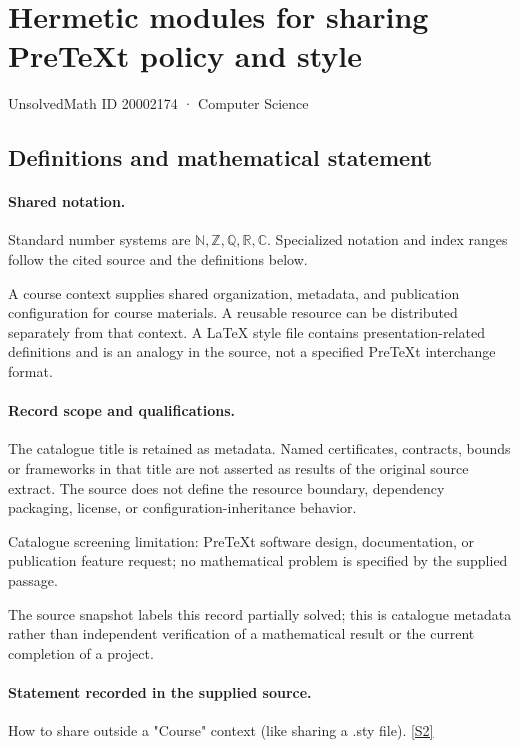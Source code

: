\documentclass[11pt]{article}
\newcommand{\sref}[2]{\hyperlink{source:#1:#2}{[S#2]}}
\begin{document}
\setcounter{section}{20002173}
\section{Hermetic modules for sharing PreTeXt policy and style}\label{20002174}
{\small\sffamily UnsolvedMath ID 20002174 · Computer Science}
\subsection{Definitions and mathematical statement}

\paragraph{Shared notation.}Standard number systems are $\mathbb N,\mathbb Z,\mathbb Q,\mathbb R,\mathbb C$. Specialized notation and index ranges follow the cited source and the definitions below.


A course context supplies shared organization, metadata, and publication configuration for course materials. A reusable resource can be distributed separately from that context. A LaTeX style file contains presentation-related definitions and is an analogy in the source, not a specified PreTeXt interchange format.
\paragraph{Record scope and qualifications.}
The catalogue title is retained as metadata. Named certificates, contracts, bounds or frameworks in that title are not asserted as results of the original source extract.
The source does not define the resource boundary, dependency packaging, license, or configuration-inheritance behavior.

Catalogue screening limitation: PreTeXt software design, documentation, or publication feature request; no mathematical problem is specified by the supplied passage.

The source snapshot labels this record partially solved; this is catalogue metadata rather than independent verification of a mathematical result or the current completion of a project.
\paragraph{Statement recorded in the supplied source.}
How to share outside a "Course" context (like sharing a .sty file). \sref{20002174}{2}
\end{document}
